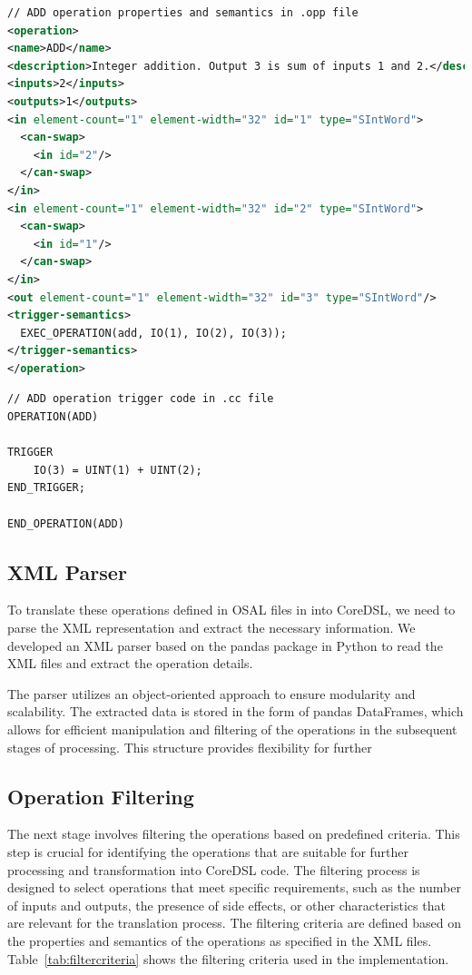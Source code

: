\begin{lstlisting}[caption={.opp file Example \cite{openasipcode}},captionpos=b,language=XML]
// ADD operation properties and semantics in .opp file
<operation>
<name>ADD</name>
<description>Integer addition. Output 3 is sum of inputs 1 and 2.</description>
<inputs>2</inputs>
<outputs>1</outputs>
<in element-count="1" element-width="32" id="1" type="SIntWord">
  <can-swap>
    <in id="2"/>
  </can-swap>
</in>
<in element-count="1" element-width="32" id="2" type="SIntWord">
  <can-swap>
    <in id="1"/>
  </can-swap>
</in>
<out element-count="1" element-width="32" id="3" type="SIntWord"/>
<trigger-semantics>
  EXEC_OPERATION(add, IO(1), IO(2), IO(3));
</trigger-semantics>
</operation>
\end{lstlisting}

\begin{lstlisting}[caption={.cc file Example \cite{openasipcode}},captionpos=b]
// ADD operation trigger code in .cc file
OPERATION(ADD)

TRIGGER
    IO(3) = UINT(1) + UINT(2);
END_TRIGGER;

END_OPERATION(ADD)
\end{lstlisting}

\subsection{XML Parser}

To translate these operations defined in OSAL files in into CoreDSL, we need to parse the XML representation and extract the necessary information. We developed an XML parser based on the pandas package in Python to read the XML files and extract the operation details.

The parser utilizes an object-oriented approach to ensure modularity and scalability. The extracted data is stored in the form of pandas DataFrames, which allows for efficient manipulation and filtering of the operations in the subsequent stages of processing. This structure provides flexibility for further

\subsection{Operation Filtering}

The next stage involves filtering the operations based on predefined criteria. This step is crucial for identifying the operations that are suitable for further processing and transformation into CoreDSL code. The filtering process is designed to select operations that meet specific requirements, such as the number of inputs and outputs, the presence of side effects, or other characteristics that are relevant for the translation process. The filtering criteria are defined based on the properties and semantics of the operations as specified in the XML files. Table~\ref{tab:filtercriteria} shows the filtering criteria used in the implementation.

